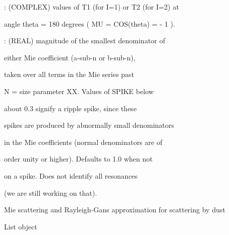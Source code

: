 \documentclass[letterpaper,10pt,english]{sphinxmanual}
\begin{document}
\begin{fulllineitems}
\begin{DUlineblock}{0em}
\item[] :   (COMPLEX) values of  T1 (for I=1) or  T2 (for I=2) at
\item[]
\begin{DUlineblock}{\DUlineblockindent}
\item[] angle  theta = 180 degrees ( MU = COS(theta) = - 1 ).
\end{DUlineblock}
\item[] :     (REAL) magnitude of the smallest denominator of
\item[]
\begin{DUlineblock}{\DUlineblockindent}
\item[] either Mie coefficient (a-sub-n or b-sub-n),
\item[] taken over all terms in the Mie series past
\item[] N = size parameter XX.  Values of SPIKE below
\item[] about 0.3 signify a ripple spike, since these
\item[] spikes are produced by abnormally small denominators
\item[] in the Mie coefficients (normal denominators are of
\item[] order unity or higher).  Defaults to 1.0 when not
\item[] on a spike.  Does not identify all resonances
\item[] (we are still working on that).
\end{DUlineblock}
\end{DUlineblock}

\end{fulllineitems}


\begin{fulllineitems}
\label{\detokenize{xscat_functions:xscat.mievs}}
Mie scattering and Rayleigh-Gans approximation for scattering by dust

\begin{fulllineitems}
\label{\detokenize{xscat_functions:xscat.mievs.list}}
List object

\end{fulllineitems}


\end{fulllineitems}
\end{document}
